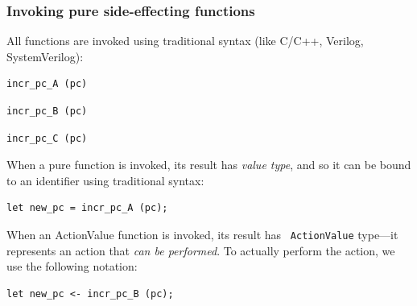 \begin{frame}[fragile]
\frametitle{Invoking pure {\vs} side-effecting functions}
\footnotesize

All functions are invoked using traditional syntax (like C/C++,
Verilog, SystemVerilog):

\begin{center}
\begin{minipage}{0.2\textwidth}
\begin{Verbatim}[frame=single]
incr_pc_A (pc)
\end{Verbatim}
\end{minipage}
\hm
\begin{minipage}{0.2\textwidth}
\begin{Verbatim}[frame=single]
incr_pc_B (pc)
\end{Verbatim}
\end{minipage}
\hm
\begin{minipage}{0.2\textwidth}
\begin{Verbatim}[frame=single]
incr_pc_C (pc)
\end{Verbatim}
\end{minipage}
\end{center}

\PAUSE{\vspace{2ex}}

When a pure function is invoked, its result has \emph{value type}, and
so it can be bound to an identifier using traditional syntax:

\begin{Verbatim}[frame=single]
   let new_pc = incr_pc_A (pc);
\end{Verbatim}

\PAUSE{\vspace{2ex}}

When an ActionValue function is invoked, its result has {\tt
ActionValue} type---it represents an action that \emph{can be
performed}.  To actually perform the action, we use the following
notation:

\begin{Verbatim}[frame=single]
   let new_pc <- incr_pc_B (pc);
\end{Verbatim}

\end{frame}


